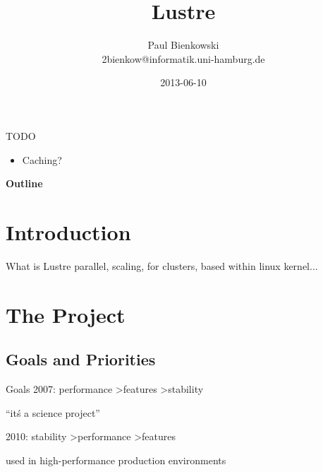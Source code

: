 \documentclass[compress,t]{beamer}
\title{Lustre}
\author{Paul Bienkowski \\[0.2em] \scriptsize 2bienkow@informatik.uni-hamburg.de}
\institute{Proseminar ``Ein-/Ausgabe - Stand der Wissenschaft''}
\date{2013-06-10}
\newif\iffinal
\newcommand{\sectiontoc}{
    \begin{frame}{\textbf{\insertsectionhead}}
        \tableofcontents[current]
    \end{frame}

    \addtocounter{framenumber}{-1}%
}
\begin{document}

\iffinal\else
\begin{frame}{TODO}
    \begin{itemize}
        \item Caching?
    \end{itemize}
\end{frame}
\fi

\begin{frame}
    \titlepage
\end{frame}

\begin{frame}{\textbf{Outline}}
    \tableofcontents
\end{frame}


\section{Introduction}

\begin{frame}{What is Lustre}
    parallel, scaling, for clusters, based within linux kernel...
\end{frame}


\section{The Project}
\sectiontoc

\subsection{Goals and Priorities}
\begin{frame}{Goals}
    2007: performance \textgreater features \textgreater stability

    ``it\'s a science project''

    2010: stability \textgreater performance \textgreater features

    used in high-performance production environments
\end{frame}
\end{document}
